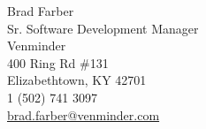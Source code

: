 Brad Farber
\\ Sr. Software Development Manager
\\ Venminder
\\ 400 Ring Rd \#131 
\\ Elizabethtown, KY 42701
\\ 1 (502) 741 3097
\\ \href{mailto:brad.farber@venminder.com}{brad.farber@venminder.com}
